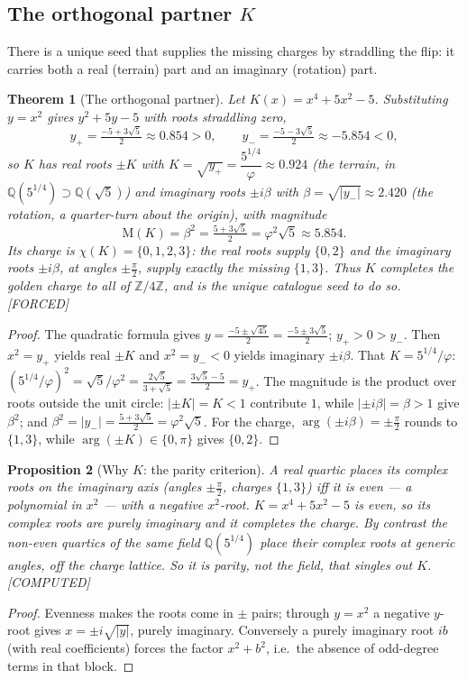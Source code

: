 \documentclass[11pt]{article}
\theoremstyle{plain}
\newtheorem{theorem}{Theorem}[section]
\newtheorem{proposition}[theorem]{Proposition}
\theoremstyle{definition}
\theoremstyle{remark}
\newcommand{\Forced}{\textcolor{forcedc}{[FORCED]}}
\newcommand{\Computed}{\textcolor{forcedc}{[COMPUTED]}}
\newcommand{\Mah}{\mathrm{M}}
\begin{document}
\subsection{The orthogonal partner $K$}
There is a unique seed that supplies the missing charges by straddling the flip: it carries both a real (terrain) part and an imaginary (rotation) part.

\begin{theorem}[The orthogonal partner]\label{thm:K}
Let $K(x)=x^{4}+5x^{2}-5$. Substituting $y=x^{2}$ gives $y^{2}+5y-5$ with roots straddling zero,
\[
y_{+}=\tfrac{-5+3\sqrt5}{2}≈0.854>0,\qquad y_{-}=\tfrac{-5-3\sqrt5}{2}≈-5.854<0,
\]
so $K$ has real roots $\pm K$ with $K=\sqrt{y_+}=\dfrac{5^{1/4}}{φ}≈0.924$ (the \emph{terrain}, in $ℚ(5^{1/4})⊃ℚ(\sqrt5)$) and imaginary roots $\pm iβ$ with $β=\sqrt{|y_-|}≈2.420$ (the \emph{rotation}, a quarter-turn about the origin), with magnitude
\[
\Mah(K)=β^{2}=\tfrac{5+3\sqrt5}{2}=φ^{2}\sqrt5≈5.854 .
\]
Its charge is $χ(K)=\{0,1,2,3\}$: the real roots supply $\{0,2\}$ and the imaginary roots $\pm iβ$, at angles $\pm\tfrac{π}{2}$, supply exactly the missing $\{1,3\}$. Thus $K$ completes the golden charge to all of $ℤ/4ℤ$, and is the unique catalogue seed to do so. \Forced
\end{theorem}
\begin{proof}
The quadratic formula gives $y=\tfrac{-5\pm\sqrt{45}}{2}=\tfrac{-5\pm3\sqrt5}{2}$; $y_+>0>y_-$. Then $x^{2}=y_+$ yields real $\pm K$ and $x^{2}=y_-<0$ yields imaginary $\pm iβ$. That $K=5^{1/4}/φ$: $(5^{1/4}/φ)^{2}=\sqrt5/φ^{2}=\tfrac{2\sqrt5}{3+\sqrt5}=\tfrac{3\sqrt5-5}{2}=y_+$. The magnitude is the product over roots outside the unit circle: $|{\pm}K|=K<1$ contribute $1$, while $|{\pm}iβ|=β>1$ give $β^{2}$; and $β^{2}=|y_-|=\tfrac{5+3\sqrt5}{2}=φ^{2}\sqrt5$. For the charge, $\arg(\pm iβ)=\pm\tfrac{π}{2}$ rounds to $\{1,3\}$, while $\arg(\pm K)∈\{0,π\}$ gives $\{0,2\}$.
\end{proof}

\begin{proposition}[Why $K$: the parity criterion]\label{prop:parity}
A real quartic places its complex roots on the imaginary axis (angles $\pm\tfrac{π}{2}$, charges $\{1,3\}$) \emph{iff} it is \emph{even} --- a polynomial in $x^{2}$ --- with a negative $x^{2}$-root. $K=x^{4}+5x^{2}-5$ is even, so its complex roots are purely imaginary and it completes the charge. By contrast the non-even quartics of the same field $ℚ(5^{1/4})$ place their complex roots at generic angles, off the charge lattice. So it is \emph{parity}, not the field, that singles out $K$. \Computed
\end{proposition}
\begin{proof}
Evenness makes the roots come in $\pm$ pairs; through $y=x^{2}$ a negative $y$-root gives $x=\pm i\sqrt{|y|}$, purely imaginary. Conversely a purely imaginary root $ib$ (with real coefficients) forces the factor $x^{2}+b^{2}$, i.e.\ the absence of odd-degree terms in that block.
\end{proof}
\end{document}
